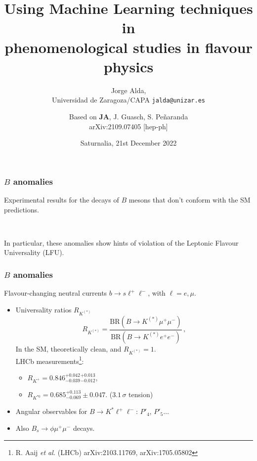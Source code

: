 \documentclass[mathserif, 10pt]{beamer}
\title[Using ML techniques in phenomenological studies in flavour physics]{Using Machine Learning techniques in\\ phenomenological studies in flavour physics}
\subtitle{Jorge Alda,\\ Universidad de Zaragoza/CAPA \hspace{4em} \texttt{jalda@unizar.es} }
\author[Jorge Alda]{Based on \textbf{JA}, J. Guasch, S. Peñaranda \\
arXiv:2109.07405 [hep-ph]}
\date[Saturnalia 2022]{Saturnalia, 21st December 2022}
\begin{document}
\begin{frame}
\titlepage
\end{frame}

\begin{frame}
    \frametitle{$B$ anomalies}

    Experimental results for the decays of $B$ mesons that don't conform with the SM predictions.

    ~

    In particular, these anomalies show hints of violation of the Leptonic Flavour Universality (LFU).

\end{frame}

\begin{frame}
    \frametitle{$B$ anomalies}

    Flavour-changing neutral currents $b \to s \ell^+ \ell^-$, with $\ell = e, \mu$.
    \begin{itemize}
        \item Universality ratios $R_{K^{(*)}}$
              $$R_{K^{(*)}} = \frac{\mathrm{BR}(B\to K^{(*)}\mu^+ \mu^-)}{\mathrm{BR}(B\to K^{(*)}e^+ e^-)}\,, $$
              In the SM, theoretically clean, and $R_{K^{(*)}}=1$.\\
              LHCb measurements\footnote{R. Aaij \textit{et al.} (LHCb) arXiv:2103.11769, arXiv:1705.05802}:
              \begin{itemize}
                  \item $R_{K^+} = 0.846^{+0.042}_{-0.039}{}^{+0.013}_{-0.012}$,
                  \item $R_{K^{*0}} = 0.685^{+0.113}_{-0.069}\pm0.047$. ($3.1\,\sigma$ tension)
              \end{itemize}
        \item Angular observables for $B\to K^* \ell^+\ell^-$: $P'_4$, $P'_5\ldots$
        \item Also $B_s \to \phi \mu^+ \mu^-$ decays.
    \end{itemize}

\end{frame}
\end{document}
